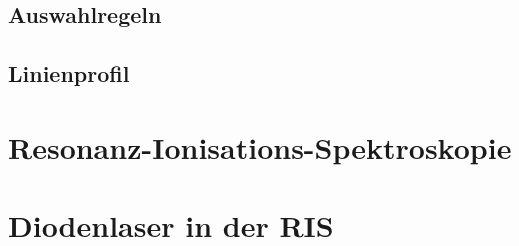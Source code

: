 \subsection{Auswahlregeln}\label{subsec:auswahlregeln}


\subsection{Linienprofil}\label{sec:linienprofil}

\section{Resonanz-Ionisations-Spektroskopie}\label{sec:ris}

\section{Diodenlaser in der RIS}\label{sec:diodenlaser}
